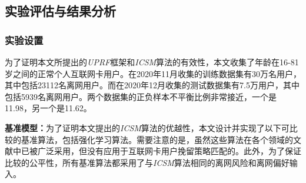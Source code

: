 
\subsection{实验评估与结果分析}
\subsubsection{实验设置}
为了证明本文所提出的\emph{UPRF}框架和\emph{ICSM}算法的有效性，本文收集了年龄在16-81岁之间的正常个人互联网卡用户。在2020年11月收集的训练数据集有30万名用户，其中包括23112名离网用户。而在2020年12月收集的测试数据集有7.5万用户，其中包括5939名离网用户。两个数据集的正负样本不平衡比例非常接近，一个是11.98，另一个是11.62。\par
\textbf{基准模型：}为了证明本文提出的\emph{ICSM}算法的优越性，本文设计并实现了以下可比较的基准算法，包括强化学习算法。需要注意的是，虽然这些算法在各个领域的文献中已被广泛采用，但没有应用于互联网卡用户挽留策略匹配的。此外，为了保证比较的公平性，所有基准算法都采用了与\emph{ICSM}算法相同的离网风险和离网偏好输入。

